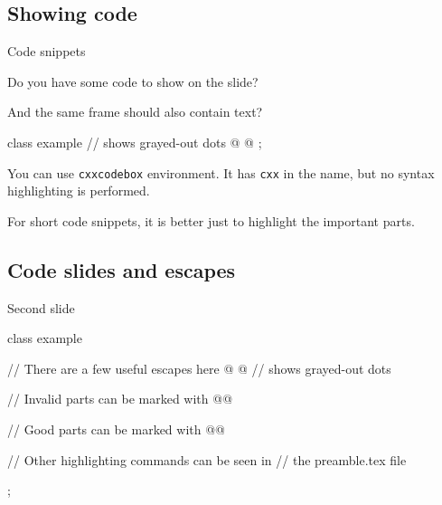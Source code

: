 \subsection{Showing code}

\begin{xframe}{Code snippets}

    Do you have some code to show on the slide?

    And the same frame should also contain text?

    \begin{cxxcodebox}
        class example {
            // \codedots shows grayed-out dots
            @ \codedots @
        };
    \end{cxxcodebox}

    You can use \verb|cxxcodebox| environment.
    It has \verb|cxx| in the name,
    but no syntax highlighting is performed.

    For short code snippets,
    it is better just to highlight the important parts.

\end{xframe}


\subsection{Code slides and escapes}

\begin{xframe}{Second slide}

    \begin{cxxcode}
        class example {
            // There are a few useful escapes here
            @ \codedots @ // \codedots shows grayed-out dots

            // Invalid parts can be marked with \hlErr
            @@

            // Good parts can be marked with \hlOk
            @@

            // Other highlighting commands can be seen in
            // the preamble.tex file
        };
    \end{cxxcode}

\end{xframe}


